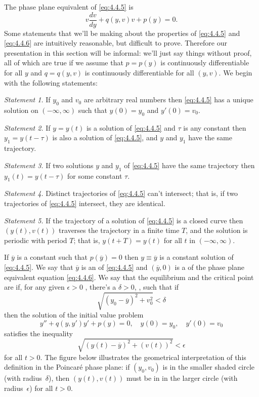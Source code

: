 \documentclass{ximera}
\begin{document}
The phase plane equivalent of \eqref{eq:4.4.5} is
\begin{equation} \label{eq:4.4.6}
v\frac{dv}{dy}+q(y,v)v+p(y)=0.
\end{equation}
Some  statements that we'll be making about the properties of
\eqref{eq:4.4.5} and \eqref{eq:4.4.6} are intuitively reasonable, but
difficult to prove.
Therefore our presentation in this section will be informal: we'll
just say things without proof, all of which are true if we assume that
$p=p(y)$ is continuously differentiable for all $y$ and $q=q(y,v)$ is
continuously differentiable for all $(y,v)$.
 We begin with the following statements:
 
\begin{fact}

\textit{Statement 1.} If $y_0$ and $v_0$ are arbitrary real numbers then
\eqref{eq:4.4.5} has a unique solution on $(-\infty,\infty)$ such that
$y(0)=y_0$ and $y'(0)=v_0$.
 
\textit{Statement 2.} If $y=y(t)$ is a solution of \eqref{eq:4.4.5}
and
$\tau$ is any constant then $y_1=y(t-\tau)$ is also a solution of
\eqref{eq:4.4.5}, and $y$ and $y_1$ have the same trajectory.
 
\textit{Statement 3.}   If two solutions $y$ and $y_1$ of
\eqref{eq:4.4.5} have the same trajectory then  $y_1(t)=y(t-\tau)$
for some constant $\tau$.
 
\textit{Statement 4.} Distinct trajectories of \eqref{eq:4.4.5} can't
intersect; that is, if two trajectories of \eqref{eq:4.4.5}
intersect,  they are identical.
 
 
\textit{Statement 5.} If the trajectory of a solution of
\eqref{eq:4.4.5}
is a closed curve then  $(y(t),v(t))$ traverses the
trajectory in a finite time $T$, and the solution is periodic with
period $T$; that is, $y(t+T)=y(t)$ for all $t$ in $(-\infty,\infty)$.
\end{fact}
 
 
If $\overline{y}$ is a constant such that $p(\overline{y})=0$ then
$y\equiv\overline{y}$ is a constant solution of \eqref{eq:4.4.5}. We say
that $\overline{y}$ is an  of \eqref{eq:4.4.5} and
 $(\overline{y},0)$ is a  of the phase plane
equivalent equation \eqref{eq:4.4.6}. We say that the equilibrium and
the critical point are  if, for any given $\epsilon>0$
, there's a $\delta>0$,
, such that if
$$
\sqrt{(y_0-\overline{y})^2+v_0^2}<\delta
$$
then the  solution of the initial value problem
$$
y''+q(y,y')y'+p(y)=0,\quad y(0)=y_0,\quad y'(0)=v_0
$$
satisfies the inequality
$$
\sqrt{(y(t)-\overline{y})^2+(v(t))^2}<\epsilon
$$
for all $t>0$. The figure below illustrates the geometrical
interpretation of this definition in the Poincar\'e phase plane: if
$(y_0,v_0)$ is in the smaller shaded circle (with radius~$\delta$), then
$(y(t),v(t))$ must be in in the larger circle (with
radius~$\epsilon$) for all $t>0$.
 
\end{document}
